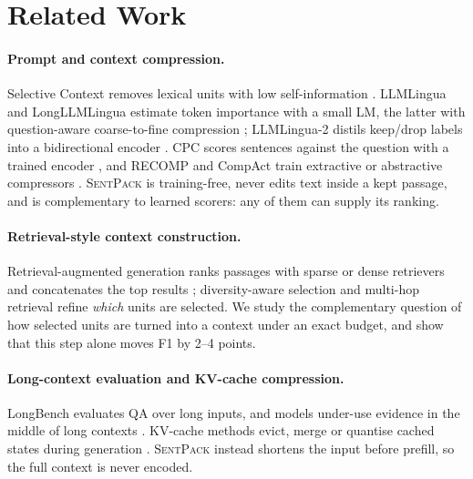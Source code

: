 \documentclass[11pt]{article}
\newcommand{\spk}{\textsc{SentPack}}
\begin{document}
\section{Related Work}

\paragraph{Prompt and context compression.}
Selective Context removes lexical units with low self-information \citep{li2023selectivecontext}. LLMLingua and LongLLMLingua estimate token importance with a small LM, the latter with question-aware coarse-to-fine compression \citep{jiang2023llmlingua,jiang2024longllmlingua}; LLMLingua-2 distils keep/drop labels into a bidirectional encoder \citep{pan2024llmlingua2}. CPC scores sentences against the question with a trained encoder \citep{liskavets2025cpc}, and RECOMP and CompAct train extractive or abstractive compressors \citep{xu2023recomp,yoon2024compact}. \spk{} is training-free, never edits text inside a kept passage, and is complementary to learned scorers: any of them can supply its ranking.

\paragraph{Retrieval-style context construction.}
Retrieval-augmented generation ranks passages with sparse \citep{robertson2009probabilistic} or dense \citep{karpukhin2020dense,xiao2023cpack} retrievers and concatenates the top results \citep{lewis2020retrieval,izacard2021leveraging}; diversity-aware selection \citep{carbonell1998mmr} and multi-hop retrieval \citep{xiong2021answering,trivedi2023interleaving} refine \emph{which} units are selected. We study the complementary question of how selected units are turned into a context under an exact budget, and show that this step alone moves F1 by 2--4 points.

\paragraph{Long-context evaluation and KV-cache compression.}
LongBench \citep{bai2023longbench} evaluates QA over long inputs, and models under-use evidence in the middle of long contexts \citep{liu2024lost}. KV-cache methods evict, merge or quantise cached states during generation \citep{xiao2023streamingllm,zhang2023h2o,li2024snapkv,liu2024kivi}. \spk{} instead shortens the input before prefill, so the full context is never encoded.
\end{document}
